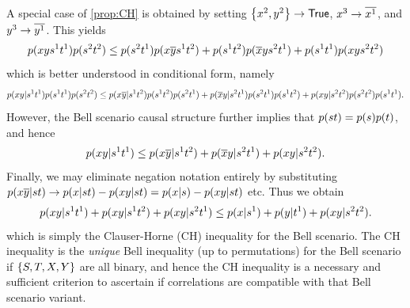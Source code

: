 A special case of \cref{prop:CH} is obtained by setting $\left\lbrace x^2,y^2\right\rbrace\to\mathsf{True}$, $x^3\to \overline{x^1}$, and $y^3\to \overline{y^1}$. This yields
\begin{align}
p\lparen x y s^1 t^1\rparen p\lparen s^2 t^2\rparen
\leq
p\lparen s^2 t^1\rparen p\lparen x \overline{y} s^1 t^2\rparen
+p\lparen s^1 t^2\rparen p\lparen\overline{x} y s^2 t^1\rparen
+p\lparen s^1 t^1\rparen p\lparen x y s^2 t^2\rparen
\end{align}
which is better understood in conditional form, namely
\begin{align}
p\lparen x y | s^1 t^1\rparen p\lparen s^1 t^1\rparen p\lparen s^2 t^2\rparen
\leq
p\lparen x \overline{y} | s^1 t^2\rparen p\lparen s^1 t^2\rparen p\lparen s^2 t^1\rparen 
+p\lparen\overline{x} y | s^2 t^1\rparen p\lparen s^2 t^1\rparen p\lparen s^1 t^2\rparen 
+p\lparen x y | s^2 t^2\rparen p\lparen s^2 t^2\rparen p\lparen s^1 t^1\rparen.
\end{align}
However, the Bell scenario causal structure further implies that $p\lparen s t\rparen=p\lparen s\rparen p\lparen t\rparen$, and hence
\begin{align}
p\lparen x y | s^1 t^1\rparen
\leq
p\lparen x \overline{y} | s^1 t^2\rparen
+p\lparen\overline{x} y | s^2 t^1\rparen
+p\lparen x y | s^2 t^2\rparen.
\end{align}
Finally, we may eliminate negation notation entirely by substituting $p\lparen x \overline{y} | s t\rparen \to p\lparen x | s t\rparen-p\lparen x y | s t\rparen = p\lparen x | s\rparen-p\lparen x y | s t\rparen$ etc. Thus we obtain
\begin{align}
p\lparen x y | s^1 t^1\rparen + p\lparen x y | s^1 t^2\rparen + p\lparen x y | s^2 t^1\rparen
\leq
p\lparen x | s^1\rparen
+p\lparen y | t^1\rparen
+p\lparen x y | s^2 t^2\rparen.
\end{align}
which is simply the Clauser-Horne (CH) inequality \cite{CHInequality} for the Bell scenario. The CH inequality is the \emph{unique} Bell inequality (up to permutations) for the Bell scenario if $\left\lbrace S,T,X,Y\right\rbrace$ are all binary, and hence the CH inequality is a necessary and sufficient criterion to ascertain if correlations are compatible with that Bell scenario variant.

\setlength{\bibsep}{3pt plus 3pt minus 2pt}

\nocite{apsrev41Control}


